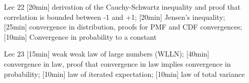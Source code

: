 \documentclass[12pt]{article}
\begin{document}
\begin{enumerate}
\item[Lec 22] [20min] derivation of the Cauchy-Schwartz inequality and proof that correlation is bounded between -1 and +1; [20min] Jensen's inequality; [25min] convergence in distribution, proofs for PMF and CDF convergences; [10min] Convergence in probability to a constant

\item[Lec 23] [15min] weak weak law of large numbers (WLLN); [40min] convergence in law, proof that convergence in law implies convergence in probability; [10min] law of iterated expectation; [10min] law of total variance
\end{enumerate}

\end{document}
